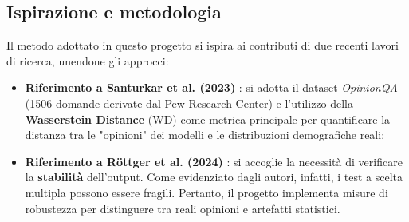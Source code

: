 \documentclass[../relazione.tex]{subfiles}
\begin{document}
\subsection{Ispirazione e metodologia}
Il metodo adottato in questo progetto si ispira ai contributi di due recenti lavori di ricerca, unendone gli approcci:
\begin{itemize}
    \item \textbf{Riferimento a Santurkar et al. (2023)} \cite{santurkar2023whose}: si adotta il dataset \textit{OpinionQA} (1506 domande derivate dal Pew Research Center) e l'utilizzo della \textbf{Wasserstein Distance} (WD) come metrica principale per quantificare la distanza tra le "opinioni" dei modelli e le distribuzioni demografiche reali;
    \item \textbf{Riferimento a Röttger et al. (2024)} \cite{rottger2024political}: si accoglie la necessità di verificare la \textbf{stabilità} dell'output. Come evidenziato dagli autori, infatti, i test a scelta multipla possono essere fragili. Pertanto, il progetto implementa misure di robustezza per distinguere tra reali opinioni e artefatti statistici.
\end{itemize}
\end{document}
